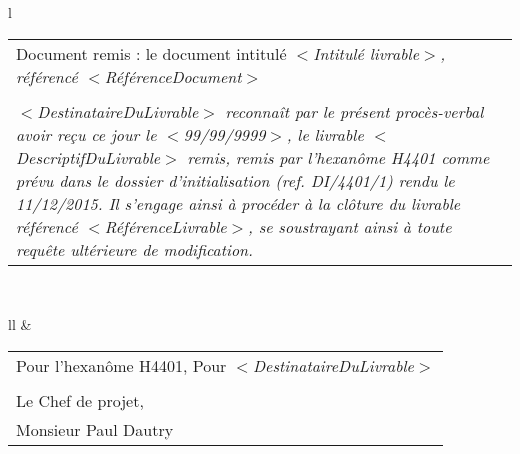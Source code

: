 
\begin{table}[H]
    \centering
    \begin{tabular}{l}
         \\
        \begin{tabular}{@{}p{15cm}@{}}
            \\ Document remis : le document intitulé \it{$<$Intitulé livrable$>$}, référencé \it{$<$RéférenceDocument$>$} \\ \\ \it{$<$DestinataireDuLivrable$>$} reconnaît par le présent procès-verbal avoir reçu ce jour le \it{$<$99/99/9999$>$}, le livrable \it{$<$DescriptifDuLivrable$>$} remis, remis par l’hexanôme H4401 comme prévu dans le dossier d’initialisation (ref. DI/4401/1) rendu le 11/12/2015. Il s’engage ainsi à procéder à la clôture du livrable référencé \it{$<$RéférenceLivrable$>$}, se soustrayant ainsi à toute requête ultérieure de modification.
        \end{tabular} \\
    \end{tabular}
\end{table}
\begin{table}[H]
    \centering
    \begin{tabular}{ll}
                                                                                                                      &  \\
        \begin{tabular}[c]{@{}l@{}}
            \\Pour l’hexanôme H4401, Pour \it{$<$DestinataireDuLivrable$>$} \\ \\ Le Chef de projet, \\ Monsieur Paul Dautry
        \end{tabular} \\                                                                                                               
    \end{tabular}
\end{table}
